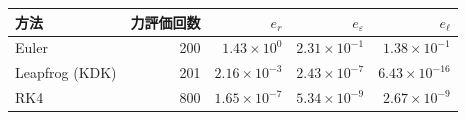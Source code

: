\begin{tabular}{lrrrr}\toprule
方法 & 力評価回数 & $e_r$ & $e_\varepsilon$ & $e_\ell$ \\
\midrule
Euler & 200 & $1.43\times 10^{0}$ & $2.31\times 10^{-1}$ & $1.38\times 10^{-1}$ \\
Leapfrog (KDK) & 201 & $2.16\times 10^{-3}$ & $2.43\times 10^{-7}$ & $6.43\times 10^{-16}$ \\
RK4 & 800 & $1.65\times 10^{-7}$ & $5.34\times 10^{-9}$ & $2.67\times 10^{-9}$ \\
\bottomrule\end{tabular}
